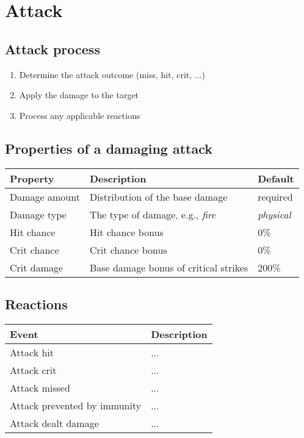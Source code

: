 \section{Attack}
\label{sec:attack}

\subsection{Attack process}

\begin{enumerate}
	\item  Determine the attack outcome (miss, hit, crit, ...)
	\item  Apply the damage to the target
	\item  Process any applicable reactions
\end{enumerate}

\subsection{Properties of a damaging attack}

\begin{tabular}{p{4cm} l l}
\toprule
Property & Description & Default \\
\midrule
Damage amount & Distribution of the base damage & required \\
Damage type & The type of damage, e.g., \emph{fire} & \emph{physical} \\
Hit chance & Hit chance bonus & 0\% \\
Crit chance & Crit chance bonus & 0\% \\
Crit damage & Base damage bonus of critical strikes & 200\% \\
\bottomrule
\end{tabular}

\subsection{Reactions}



\begin{tabular}{p{6cm} p{8cm}}
\toprule
Event & Description \\
\midrule
Attack hit & ... \\
Attack crit & ... \\
Attack missed & ... \\
Attack prevented by immunity & ... \\
Attack dealt damage & ... \\
\bottomrule
\end{tabular}

